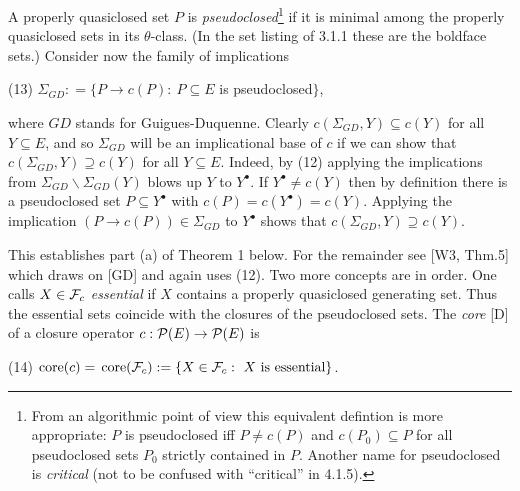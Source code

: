 \documentclass[11pt]{article}
\newcommand{\ra}{\rightarrow}
\begin{document}
A properly quasiclosed set $P$ is {\it pseudoclosed}\footnote{From an algorithmic point of view this equivalent defintion is more appropriate: $P$ is pseudoclosed iff $P \neq c(P)$ and $c(P_0) \subseteq P$ for all pseudoclosed sets $P_0$ strictly contained in $P$. Another name for pseudoclosed is {\it critical} (not to be confused with ``critical'' in 4.1.5).} if it is minimal among the properly quasiclosed sets in its $\theta$-class. (In the set listing of 3.1.1 these are the boldface sets.) Consider now the family of implications

(13) \quad $\Sigma_{GD} : = \{P \ra c(P): \ P \subseteq E$ is pseudoclosed$\}$,

where $GD$ stands for Guigues-Duquenne. Clearly $c(\Sigma_{GD}, Y) \subseteq c(Y)$ for all $Y \subseteq E$, and so $\Sigma_{GD}$ will be an implicational base of $c$ if we can show that $c(\Sigma_{GD}, Y) \supseteq c(Y)$ for all $Y \subseteq E$. Indeed, by (12) applying the implications from $\Sigma_{GD}\backslash \Sigma_{GD}(Y)$ blows up $Y$ to $Y^\bullet$. If $Y^\bullet \neq c(Y)$ then by definition there is a pseudoclosed set $P\subseteq Y^\bullet$ with $c(P) = c(Y^\bullet) = c(Y)$. Applying the implication $(P \ra c(P))\in \Sigma_{GD}$ to $Y^\bullet$ shows that $c(\Sigma_{GD}, Y) \supseteq c(Y)$.

This establishes part (a) of Theorem 1 below. For the remainder see [W3, Thm.5] which draws on [GD] and again uses (12). Two more concepts are in order.
One calls $X \in {\cal F}_c$ {\it essential} if $X$ contains a properly quasiclosed generating set. Thus the essential sets coincide with the closures of the pseudoclosed sets.
The {\it core}  [D] of a closure operator $c: {\cal P}(E) \ra {\cal P}(E)$ is

(14) \quad $\mbox{core}(c) =\, \mbox{core}({\cal F}_c): = \{X \in {\cal F}_c : \ X \ \mbox{is essential} \}$.
\end{document}
